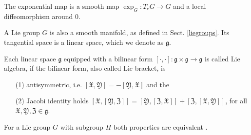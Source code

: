 \documentclass[envcountsect,runningheads]{llncs}
\begin{document}
\begin{remarkdef}
The exponential map is a smooth map $\exp_G: T_eG \rightarrow G$ and a local diffeomorphism around $0$.
\end{remarkdef}

A Lie group $G$ is also a smooth manifold, as defined in Sect. \ref{liegroups}. Its tangential space is a linear space, which we denote as $\mathfrak{g}$.

\begin{definition}
Each linear space $\mathfrak{g}$ equipped with a bilinear form $[\cdot,\cdot]: \mathfrak{g} \times \mathfrak{g} \rightarrow \mathfrak{g}$ is called Lie algebra, if the bilinear form, also called Lie bracket, is 
\begin{itemize}
	\item[(1)] antisymmetric, i.e. $[\mathfrak{X}, \mathfrak{Y}] = -[\mathfrak{Y}, \mathfrak{X}]$ and the
	\item[(2)] Jacobi identity holds $[\mathfrak{X},[\mathfrak{Y},\mathfrak{Z}]] = [\mathfrak{Y},[\mathfrak{Z},\mathfrak{X}]] + [\mathfrak{Z},[\mathfrak{X},\mathfrak{Y}]]$, for all $\mathfrak{X}, \mathfrak{Y}, \mathfrak{Z} \in \mathfrak{g}$.
\end{itemize}
\end{definition}

\begin{remarkdef}
For a Lie group $G$ with subgroup $H$ both properties are equivalent \cite[pp.~25-27]{van2003lie}.
\end{remarkdef}
\end{document}
